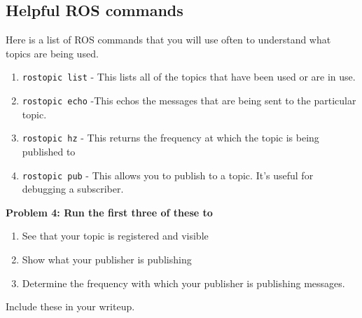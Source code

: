 \subsection{Helpful ROS commands}
Here is a list of ROS commands that you will use often to understand what topics are being used.
\begin{enumerate}
	\item \texttt{rostopic list} - This lists all of the topics that have been used or are in use.
	\item \texttt{rostopic echo} -This echos the messages that are being sent to the particular topic.
	\item \texttt{rostopic hz} - This returns the frequency at which the topic is being published to
	\item \texttt{rostopic pub} - This allows you to publish to a topic. It's useful for debugging a subscriber.
\end{enumerate}

{\bf Problem 4: Run the first three of these to
\begin{enumerate}[label=(\alph*)]
    \item See that your topic is registered and visible
    \item Show what your publisher is publishing
    \item Determine the frequency with which your publisher is publishing messages.
\end{enumerate}
Include these in your writeup.}